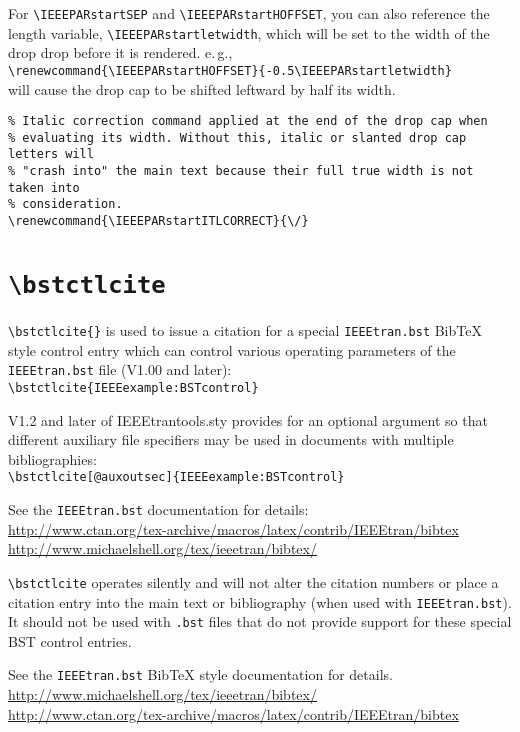 \documentclass[pagesize=auto]{scrartcl}
\begin{document}
For \verb+\IEEEPARstartSEP+ and \verb+\IEEEPARstartHOFFSET+, you can also reference the
length variable, \verb+\IEEEPARstartletwidth+, which will be set to the width of
the drop drop before it is rendered. e.\,g.,\\
\verb+\renewcommand{\IEEEPARstartHOFFSET}{-0.5\IEEEPARstartletwidth}+\\
will cause the drop cap to be shifted leftward by half its width.
%
\begin{lstlisting}
% Italic correction command applied at the end of the drop cap when
% evaluating its width. Without this, italic or slanted drop cap letters will
% "crash into" the main text because their full true width is not taken into
% consideration.
\renewcommand{\IEEEPARstartITLCORRECT}{\/}
\end{lstlisting}


\section{\texttt{\textbackslash bstctlcite}}

\verb+\bstctlcite{}+ is used to issue a citation for a special \texttt{IEEEtran.bst} BibTeX
style control entry which can control various operating parameters of the
\texttt{IEEEtran.bst} file (V1.00 and later):\\
\verb+\bstctlcite{IEEEexample:BSTcontrol}+

V1.2 and later of \textsf{IEEEtrantools.sty} provides for an optional argument so
that different auxiliary file specifiers may be used in documents with
multiple bibliographies:\\
\verb+\bstctlcite[@auxoutsec]{IEEEexample:BSTcontrol}+

See the \texttt{IEEEtran.bst} documentation for details:\\
\url{http://www.ctan.org/tex-archive/macros/latex/contrib/IEEEtran/bibtex}\\
\url{http://www.michaelshell.org/tex/ieeetran/bibtex/}

\verb+\bstctlcite+ operates silently and will not alter the citation numbers or
place a citation entry into the main text or bibliography (when used with
\texttt{IEEEtran.bst}). It should not be used with \texttt{.bst} files that do not provide
support for these special BST control entries.

See the \texttt{IEEEtran.bst} BibTeX style documentation for details.\\
\url{http://www.michaelshell.org/tex/ieeetran/bibtex/}\\
\url{http://www.ctan.org/tex-archive/macros/latex/contrib/IEEEtran/bibtex}
\end{document}
